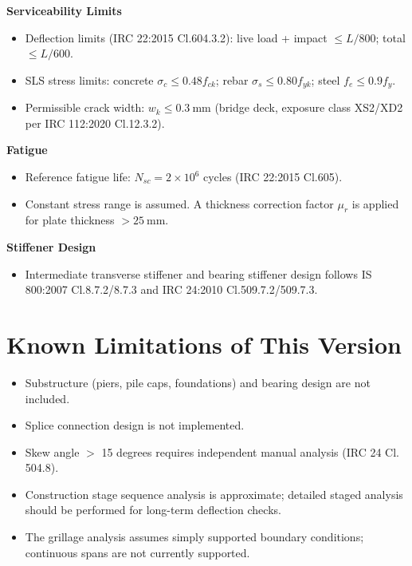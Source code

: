 \documentclass[12pt,a4paper]{report}
\numberwithin{table}{chapter}
\numberwithin{figure}{chapter}
\begin{document}
\textbf{Serviceability Limits}

\begin{itemize}
\item Deflection limits (IRC 22:2015 Cl.604.3.2): live load + impact $\leq L/800$; total $\leq L/600$.
\item SLS stress limits: concrete $\sigma_c \leq 0.48 f_{ck}$; rebar $\sigma_s \leq 0.80 f_{yk}$; steel $f_e \leq 0.9 f_y$.
\item Permissible crack width: $w_k \leq 0.3 \ \text{mm}$ (bridge deck, exposure class XS2/XD2 per IRC 112:2020 Cl.12.3.2).
\end{itemize}

\textbf{Fatigue}

\begin{itemize}
\item Reference fatigue life: $N_{sc} = 2 \times 10^6$ cycles (IRC 22:2015 Cl.605).
\item Constant stress range is assumed. A thickness correction factor $\mu_r$ is applied for plate thickness $> 25 \ \text{mm}$.
\end{itemize}

\textbf{Stiffener Design}

\begin{itemize}
\item Intermediate transverse stiffener and bearing stiffener design follows IS 800:2007 Cl.8.7.2/8.7.3 and IRC 24:2010 Cl.509.7.2/509.7.3.
\end{itemize}


\section{Known Limitations of This Version}
\label{sec:limitations}

\begin{itemize}
\item Substructure (piers, pile caps, foundations) and bearing design are not included.
\item Splice connection design is not implemented.
\item Skew angle $>$ 15 degrees requires independent manual analysis (IRC 24 Cl. 504.8).
\item Construction stage sequence analysis is approximate; detailed staged analysis
  should be performed for long-term deflection checks.
\item The grillage analysis assumes simply supported boundary conditions;
  continuous spans are not currently supported.
\end{itemize}
\end{document}
